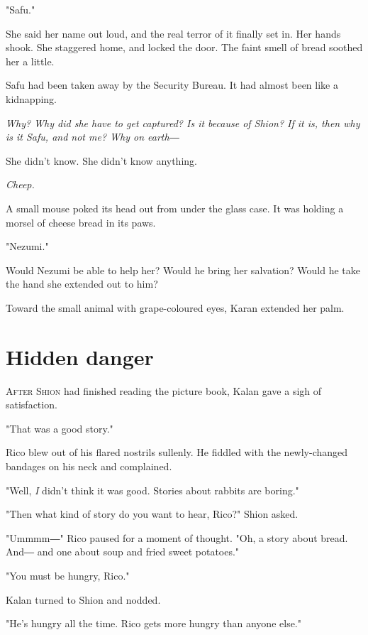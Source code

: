 "Safu."

She said her name out loud, and the real terror of it finally set in.
Her hands shook. She staggered home, and locked the door. The faint
smell of bread soothed her a little.

Safu had been taken away by the Security Bureau. It had almost been like
a kidnapping.

\emph{Why? Why did she have to get captured? Is it because of Shion? If it is,
	then why is it Safu, and not me? Why on earth―}

She didn't know. She didn't know anything.

\emph{Cheep.}

A small mouse poked its head out from under the glass case. It was
holding a morsel of cheese bread in its paws.

"Nezumi."

Would Nezumi be able to help her? Would he bring her salvation? Would he
take the hand she extended out to him?

Toward the small animal with grape-coloured eyes, Karan extended her
palm.

\chapter{Hidden danger}


\lettrine{A}{fter Shion} had finished reading the picture book, Kalan gave a sigh of
satisfaction.

"That was a good story."

Rico blew out of his flared nostrils sullenly. He fiddled with the
newly-changed bandages on his neck and complained.

"Well, \emph{I} didn't think it was good. Stories about rabbits are boring."

"Then what kind of story do you want to hear, Rico?" Shion asked.

"Ummmm―" Rico paused for a moment of thought. "Oh, a story about bread.
And― and one about soup and fried sweet potatoes."

"You must be hungry, Rico."

Kalan turned to Shion and nodded.

"He's hungry all the time. Rico gets more hungry than anyone else."

